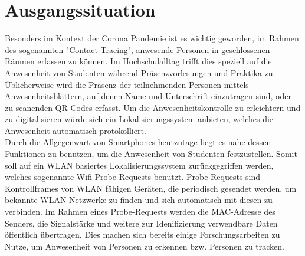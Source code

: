 \section{Ausgangssituation}
\label{introduction}

Besonders im Kontext der Corona Pandemie ist es wichtig geworden, im Rahmen des sogenannten "Contact-Tracing", anwesende Personen in geschlossenen Räumen erfassen zu können.
Im Hochschulalltag trifft dies speziell auf die Anwesenheit von Studenten während Präsenzvorlesungen und Praktika zu.
Üblicherweise wird die Präsenz der teilnehmenden Personen mittels Anwesenheitsblättern, auf denen Name und Unterschrift einzutragen sind, oder zu scanenden QR-Codes erfasst.
Um die Anwesenheitskontrolle zu erleichtern und zu digitalisieren würde sich ein Lokalisierungssystem anbieten, welches die Anwesenheit automatisch protokolliert.
\\

Durch die Allgegenwart von Smartphones heutzutage liegt es nahe dessen Funktionen zu benutzen, um die Anwesenheit von Studenten festzustellen.
Somit soll auf ein WLAN basiertes Lokalisierungssystem zurückgegriffen werden, welches sogenannte Wifi Probe-Requests benutzt.
Probe-Requests sind Kontrollframes von WLAN fähigen Geräten, die periodisch gesendet werden, um bekannte WLAN-Netzwerke zu finden und sich automatisch mit diesen zu verbinden. \cite{wifiproberequests2019}
Im Rahmen eines Probe-Requests werden die MAC-Adresse des Senders, die Signalstärke und weitere zur Idenifizierung verwendbare Daten öffentlich übertragen.
Dies machen sich bereits einige Forschungsarbeiten zu Nutze, um Anwesenheit von Personen zu erkennen bzw. Personen zu tracken. \cite{sail2014,sherlock2018}
